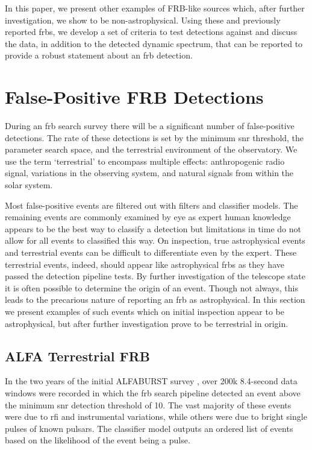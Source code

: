 \documentclass[a4paper,fleqn,usenatbib]{mnras}
\begin{document}
In this paper, we present other examples of FRB-like sources which, after
further investigation, we show to be non-astrophysical. Using these and
previously reported \glspl{frb}, we develop a set of criteria to test detections
against and discuss the data, in addition to the detected dynamic spectrum, that
can be reported to provide a robust statement about an \gls{frb} detection.

\section{False-Positive FRB Detections}
\label{sec:false-pos}

During an \gls{frb} search survey there will be a significant number of
false-positive detections. The rate of these detections is set by the minimum
\gls{snr} threshold, the parameter search space, and the terrestrial environment
of the observatory. We use the term `terrestrial' to encompass multiple effects:
anthropogenic radio signal, variations in the observing system, and natural
signals from within the solar system.

Most false-positive events are filtered out with filters and classifier models.
The remaining events are commonly examined by eye as expert human knowledge
appears to be the best way to classify a detection but limitations in time do
not allow for all events to classified this way. On inspection, true
astrophysical events and terrestrial events can be difficult to differentiate
even by the expert.  These terrestrial events, indeed, should appear like
astrophysical \glspl{frb} as they have passed the detection pipeline tests. By
further investigation of the telescope state it is often possible to determine
the origin of an event. Though not always, this leads to the precarious nature
of reporting an \gls{frb} as astrophysical.  In this section we present examples
of such events which on initial inspection appear to be astrophysical, but after
further investigation prove to be terrestrial in origin.

\subsection{ALFA Terrestrial FRB}
\label{sec:D20161204}

In the two years of the initial ALFABURST survey \citep{2017ApJS..228...21C,
2018MNRAS.474.3847F}, over 200k 8.4-second data windows were recorded in which
the \gls{frb} search pipeline detected an event above the minimum \gls{snr}
detection threshold of 10.  The vast majority of these events were due to
\gls{rfi} and instrumental variations, while others were due to bright single
pulses of known pulsars.  The classifier model outputs an ordered list of events
based on the likelihood of the event being a pulse.
\end{document}
